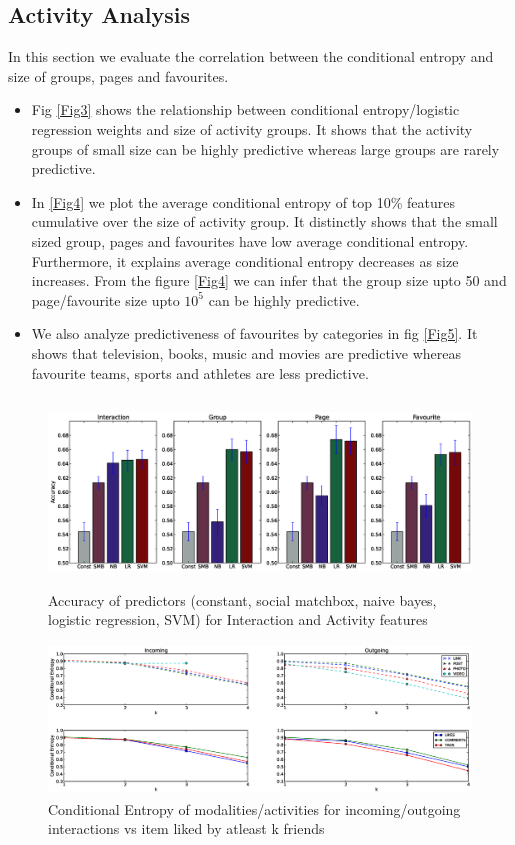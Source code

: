 \subsection{Activity Analysis}
In this section we evaluate the correlation between the conditional entropy and size of groups, pages and favourites. 
\begin{itemize}
  \item Fig \ref{Fig3} shows the relationship between conditional entropy/logistic regression weights and size of activity groups. It  shows that the activity groups
  	    of small size can be highly predictive whereas large groups are rarely predictive.
  \item In \ref{Fig4} we plot the average conditional entropy of top 10\% features cumulative over the size of activity group. It distinctly shows that the small sized
  		group, pages and favourites have low average conditional entropy. Furthermore, it explains average conditional entropy decreases as size increases. From the 
  		figure \ref{Fig4} we can infer that the group size upto 50 and page/favourite size upto $10^{5}$ can be highly predictive.   
  \item We also analyze predictiveness of favourites by categories in fig \ref{Fig5}. It shows that television, books, music and movies are predictive whereas 
  favourite teams, sports and athletes are less predictive. 
\end{itemize}

\begin{figure}[t!]
\centering
\includegraphics[width=230mm, height=50mm]{data/plots/accuracy/accuracy.eps}
\caption{ Accuracy of predictors (constant, social matchbox, naive bayes, logistic regression, SVM) for Interaction and Activity  features }
\label{Fig1}
\end{figure}

\begin{figure}
\centering
\includegraphics[width=160mm, height=40mm]{data/plots/vsk/ModalityActionsvsKFriends.eps}
\caption{Conditional Entropy  of modalities/activities for incoming/outgoing interactions vs item liked by atleast k friends}
\label{Fig2}
\end{figure}

